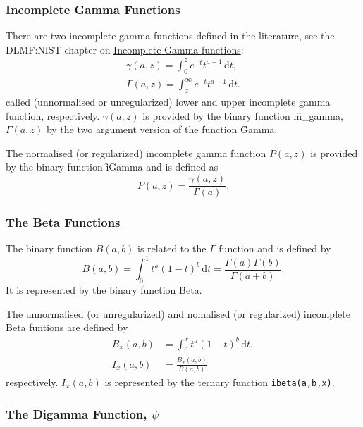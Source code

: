 \subsubsection{Incomplete Gamma Functions}
\hypertarget{operator:M_GAMMA}{}
There are two incomplete gamma functions defined in the literature, see the DLMF:NIST
chapter on \href{https://dlmf.nist.gov/8.2#i}{Incomplete Gamma functions}:
\begin{align*}
  \gamma(a, z) = \int_0^z e^{-t}t^{a-1}\, \mathrm{d}t, \\
  \Gamma(a, z) = \int_z^{\infty} e^{-t}t^{a-1}\, \mathrm{d}t.
\end{align*}
called (unnormalised or unregularized) lower and upper incomplete
gamma function, respectively.
$\gamma(a,z)$ is provided by the binary function \f{m\_gamma}, $\Gamma(a,z)$ by
the two argument version of the function \f{Gamma}.

The normalised (or regularized) incomplete gamma function $P(a,z)$ is
provided by the binary function \f{iGamma} and is defined as
\[P(a,z) = \frac{\gamma(a,z)}{\Gamma(a)}.\]

\subsubsection{The Beta Functions}
\hypertarget{BETAF}{}
\hypertarget{operator:BETA}{}
\hypertarget{operator:IBETA}{}
The binary function $B(a,b)$ is related to the $\Gamma$
function\cite{AbramowitzStegun:72} and is defined by
\[ B(a,b) = \int_0^1 t^a (1-t)^b\, \mathrm{d}t =
\frac{\Gamma(a)\Gamma(b)}{\Gamma(a+b)}.\]
It is represented by the binary function \f{Beta}.

The unnormalised (or unregularized) and nomalised (or regularized)
incomplete Beta funtions are defined by
\begin{align*}
B_x(a,b) & = \int_0^x t^a (1-t)^b\, \mathrm{d}t,\\
I_x(a,b) & = \frac{B_x(a,b)}{B(a,b)}
\end{align*}
respectively. $I_x(a,b)$ is represented by the ternary function
\texttt{ibeta(a,b,x)}.

\subsubsection{The Digamma Function, $\psi$}
\hypertarget{DIGAM}{}
%

